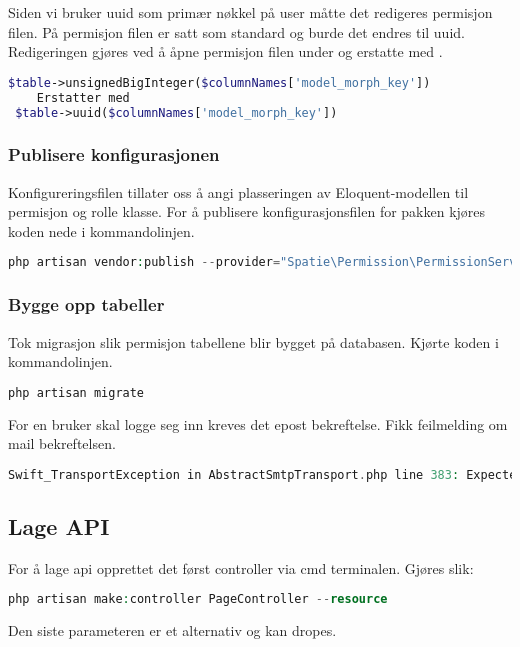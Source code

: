 Siden vi bruker uuid som primær nøkkel på user måtte det redigeres permisjon filen. På permisjon filen er satt  som standard og burde det endres til uuid. Redigeringen gjøres ved å åpne permisjon filen  under  og erstatte  med .
\begin{lstlisting}[language=PHP]
  $table->unsignedBigInteger($columnNames['model_morph_key'])
    Erstatter med
 $table->uuid($columnNames['model_morph_key'])
\end{lstlisting}

\subsubsection{Publisere konfigurasjonen}
Konfigureringsfilen tillater oss å angi plasseringen av Eloquent-modellen til permisjon og rolle klasse.
For å publisere konfigurasjonsfilen for pakken kjøres koden nede i kommandolinjen.

\begin{lstlisting}[language=PHP]
  php artisan vendor:publish --provider="Spatie\Permission\PermissionServiceProvider" --tag="config"
\end{lstlisting}

\subsubsection{Bygge opp tabeller}
Tok migrasjon slik permisjon tabellene blir bygget på databasen.
Kjørte koden i kommandolinjen.
\begin{lstlisting}[language=PHP]
  php artisan migrate
\end{lstlisting}

For en bruker skal logge seg inn kreves det epost bekreftelse.
Fikk feilmelding om mail bekreftelsen.
\begin{lstlisting}[language=PHP]
    Swift_TransportException in AbstractSmtpTransport.php line 383: Expected response code 250 but got code "530", with message "530 5.7.1 Authentication required
\end{lstlisting}

\subsection{Lage API}
For å lage api opprettet det først controller\cite{laravel2019c} via cmd terminalen.
Gjøres slik:
\begin{lstlisting}[language=PHP]
    php artisan make:controller PageController --resource
\end{lstlisting}
Den siste parameteren  er et alternativ og kan dropes.

